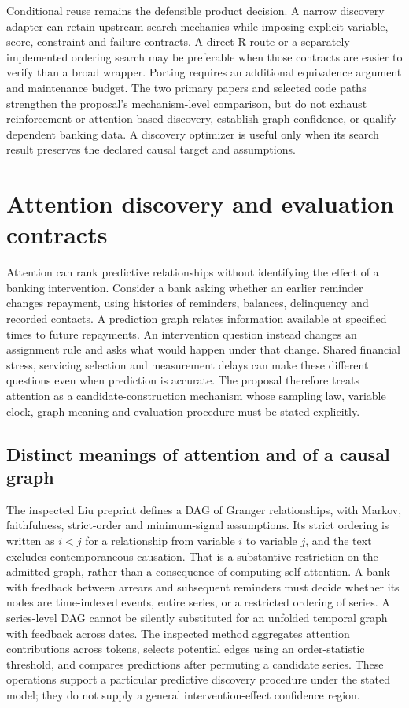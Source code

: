 Conditional reuse remains the defensible product decision. A narrow discovery adapter can retain
upstream search mechanics while imposing explicit variable, score, constraint and failure contracts.
A direct R route or a separately implemented ordering search may be preferable when those
contracts are easier to verify than a broad wrapper. Porting requires an additional equivalence
argument and maintenance budget. The two primary papers and selected code paths strengthen the
proposal's mechanism-level comparison, but do not exhaust reinforcement or attention-based
discovery, establish graph confidence, or qualify dependent banking data.
A discovery optimizer is useful only when its search result preserves the declared causal target and assumptions.


\section[Attention discovery and evaluation contracts]{Attention discovery and evaluation contracts}
\label{sec:exec28-at}
Attention can rank predictive relationships without identifying the effect of a banking intervention.
Consider a bank asking whether an earlier reminder changes repayment, using histories of reminders,
balances, delinquency and recorded contacts. A prediction graph relates information available at
specified times to future repayments. An intervention question instead changes an assignment rule
and asks what would happen under that change. Shared financial stress, servicing selection and
measurement delays can make these different questions even when prediction is accurate. The
proposal therefore treats attention as a candidate-construction mechanism whose sampling law,
variable clock, graph meaning and evaluation procedure must be stated explicitly.

\subsection{Distinct meanings of attention and of a causal graph}
The inspected Liu preprint defines a DAG of Granger relationships, with Markov, faithfulness,
strict-order and minimum-signal assumptions. Its strict ordering is written as $i<j$ for a
relationship from variable $i$ to variable $j$, and the text excludes contemporaneous causation.
That is a substantive restriction on the admitted graph, rather than a consequence of computing
self-attention. A bank with feedback between arrears and subsequent reminders must decide whether
its nodes are time-indexed events, entire series, or a restricted ordering of series. A series-level
DAG cannot be silently substituted for an unfolded temporal graph with feedback across dates.
The inspected method aggregates attention contributions across tokens, selects potential edges
using an order-statistic threshold, and compares predictions after permuting a candidate series.
These operations support a particular predictive discovery procedure under the stated model;
they do not supply a general intervention-effect confidence region.~\citep{exec28_at_liu}

